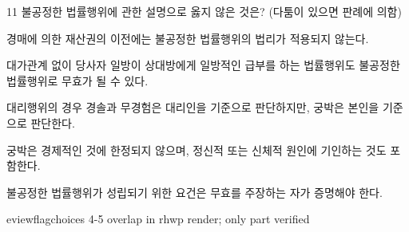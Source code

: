 \begin{question}{11}
불공정한 법률행위에 관한 설명으로 옳지 않은 것은? (다툼이 있으면 판례에 의함)
\begin{choices}
  \item 경매에 의한 재산권의 이전에는 불공정한 법률행위의 법리가 적용되지 않는다.
  \item 대가관계 없이 당사자 일방이 상대방에게 일방적인 급부를 하는 법률행위도 불공정한 법률행위로 무효가 될 수 있다.
  \item 대리행위의 경우 경솔과 무경험은 대리인을 기준으로 판단하지만, 궁박은 본인을 기준으로 판단한다.
  \item 궁박은 경제적인 것에 한정되지 않으며, 정신적 또는 신체적 원인에 기인하는 것도 포함한다.
  \item 불공정한 법률행위가 성립되기 위한 요건은 무효를 주장하는 자가 증명해야 한다.
\end{choices}

eviewflag{choices 4-5 overlap in rhwp render; only part verified}
\end{question}

